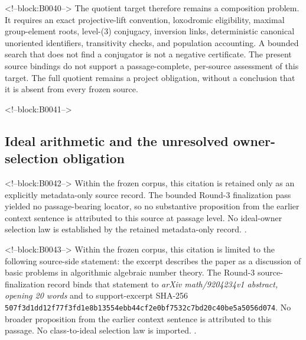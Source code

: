 \documentclass[11pt,a4paper]{article}
\begin{document}
<!--block:B0040-->
The quotient target therefore remains a composition problem. It requires an exact projective-lift convention, loxodromic eligibility, maximal group-element roots, level-(3) conjugacy, inversion links, deterministic canonical unoriented identifiers, transitivity checks, and population accounting. A bounded search that does not find a conjugator is not a negative certificate. The present source bindings do not support a passage-complete, per-source assessment of this target. The full quotient remains a project obligation, without a conclusion that it is absent from every frozen source.

<!--block:B0041-->
\subsection{Ideal arithmetic and the unresolved owner-selection obligation}

<!--block:B0042-->
Within the frozen corpus, this citation is retained only as an explicitly metadata-only source record. The bounded Round-3 finalization pass yielded no passage-bearing locator, so no substantive proposition from the earlier context sentence is attributed to this source at passage level. No ideal-owner selection law is established by the retained metadata-only record.
\citep{P29-S19}.

<!--block:B0043-->
Within the frozen corpus, this citation is limited to the following source-side statement: the excerpt describes the paper as a discussion of basic problems in algorithmic algebraic number theory. The Round-3 source-finalization record binds that statement to \emph{arXiv math/9204234v1 abstract, opening 20 words} and to support-excerpt SHA-256 \texttt{507f3d1d\allowbreak{}d12f77f3\allowbreak{}fd1e8b13\allowbreak{}554ebb44\allowbreak{}cf2e0bf7\allowbreak{}532c7bd2\allowbreak{}0c40be5a\allowbreak{}5056d074}. No broader proposition from the earlier context sentence is attributed to this passage. No class-to-ideal selection law is imported.
\citep{P29-S20}.
\end{document}
